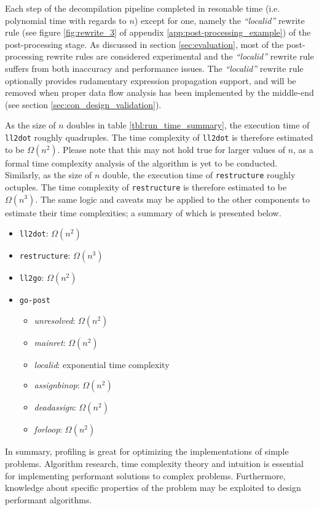 Each step of the decompilation pipeline completed in resonable time (i.e. polynomial time with regards to $ n $) except for one, namely the \textit{``localid''} rewrite rule (see figure \ref{fig:rewrite_3} of appendix \ref{app:post-processing_example}) of the post-processing stage. As discussed in section \ref{sec:evaluation}, most of the post-processing rewrite rules are considered experimental and the \textit{``localid''} rewrite rule suffers from both inaccuracy and performance issues. The \textit{``localid''} rewrite rule optionally provides rudamentary expression propagation support, and will be removed when proper data flow analysis has been implemented by the middle-end (see section \ref{sec:con_design_validation}).

As the size of $ n $ doubles in table \ref{tbl:run_time_summary}, the execution time of \texttt{ll2dot} roughly quadruples. The time complexity of \texttt{ll2dot} is therefore estimated to be $ \Omega(n^{2}) $. Please note that this may not hold true for larger values of $ n $, as a formal time complexity analysis of the algorithm is yet to be conducted. Similarly, as the size of $ n $ double, the execution time of \texttt{restructure} roughly octuples. The time complexity of \texttt{restructure} is therefore estimated to be $ \Omega(n^{3}) $. The same logic and caveats may be applied to the other components to estimate their time complexities; a summary of which is presented below.

\begin{itemize}
	\item \texttt{ll2dot}: $ \Omega(n^{2}) $
	\item \texttt{restructure}: $ \Omega(n^{3}) $
	\item \texttt{ll2go}: $ \Omega(n^{2}) $
	\item \texttt{go-post}
	\begin{itemize}
		\item \textit{unresolved}: $ \Omega(n^{2}) $
		\item \textit{mainret}: $ \Omega(n^{2}) $
		\item \textit{localid}: exponential time complexity
		\item \textit{assignbinop}: $ \Omega(n^{2}) $
		\item \textit{deadassign}: $ \Omega(n^{2}) $
		\item \textit{forloop}: $ \Omega(n^{2}) $
	\end{itemize}
\end{itemize}

In summary, profiling is great for optimizing the implementations of simple problems. Algorithm research, time complexity theory and intuition is essential for implementing performant solutions to complex problems. Furthermore, knowledge about specific properties of the problem may be exploited to design performant algorithms.




